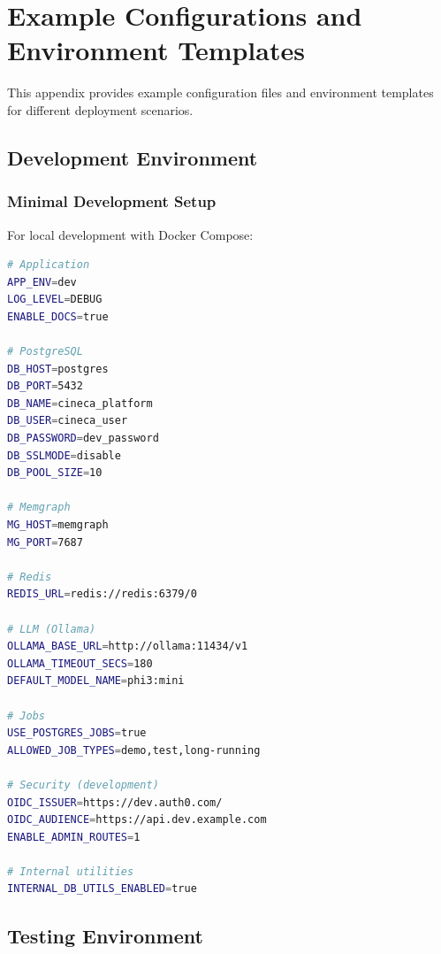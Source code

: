 
\chapter{Example Configurations and Environment Templates}
\label{app:example-configs}

This appendix provides example configuration files and environment templates for different deployment scenarios.

\section{Development Environment}
\label{app:config:dev}

\subsection{Minimal Development Setup}

For local development with Docker Compose:

\begin{lstlisting}[language=bash,caption={.env.development}]
# Application
APP_ENV=dev
LOG_LEVEL=DEBUG
ENABLE_DOCS=true

# PostgreSQL
DB_HOST=postgres
DB_PORT=5432
DB_NAME=cineca_platform
DB_USER=cineca_user
DB_PASSWORD=dev_password
DB_SSLMODE=disable
DB_POOL_SIZE=10

# Memgraph
MG_HOST=memgraph
MG_PORT=7687

# Redis
REDIS_URL=redis://redis:6379/0

# LLM (Ollama)
OLLAMA_BASE_URL=http://ollama:11434/v1
OLLAMA_TIMEOUT_SECS=180
DEFAULT_MODEL_NAME=phi3:mini

# Jobs
USE_POSTGRES_JOBS=true
ALLOWED_JOB_TYPES=demo,test,long-running

# Security (development)
OIDC_ISSUER=https://dev.auth0.com/
OIDC_AUDIENCE=https://api.dev.example.com
ENABLE_ADMIN_ROUTES=1

# Internal utilities
INTERNAL_DB_UTILS_ENABLED=true
\end{lstlisting}

\section{Testing Environment}
\label{app:config:test}

